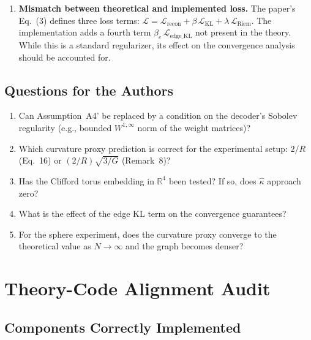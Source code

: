 \documentclass{article}
\newcommand{\RR}{\mathbb{R}}
\begin{document}
\begin{enumerate}[label=\textbf{W\arabic*.}]
    \item \textbf{Mismatch between theoretical and implemented loss.}
      The paper's Eq.~(3) defines three loss terms:
      $\mathcal{L} = \mathcal{L}_{\text{recon}} + \beta\,\mathcal{L}_{\text{KL}}
      + \lambda\,\mathcal{L}_{\text{Riem}}$.
      The implementation adds a fourth term
      $\beta_e\,\mathcal{L}_{\text{edge\_KL}}$ not present in the theory.
      While this is a standard regularizer, its effect on the convergence
      analysis should be accounted for.
\end{enumerate}

\subsection{Questions for the Authors}

\begin{enumerate}[label=\textbf{Q\arabic*.}]
    \item Can Assumption~A4' be replaced by a condition on the decoder's
      Sobolev regularity (e.g., bounded $W^{1,\infty}$ norm of the weight
      matrices)?

    \item Which curvature proxy prediction is correct for the experimental
      setup: $2/R$ (Eq.~16) or $(2/R)\sqrt{3/G}$ (Remark~8)?

    \item Has the Clifford torus embedding in $\RR^4$ been tested? If so,
      does $\hat{\kappa}$ approach zero?

    \item What is the effect of the edge KL term on the convergence
      guarantees?

    \item For the sphere experiment, does the curvature proxy converge to the
      theoretical value as $N \to \infty$ and the graph becomes denser?
\end{enumerate}


\section{Theory-Code Alignment Audit}
\label{sec:alignment}

\subsection{Components Correctly Implemented}
\end{document}
